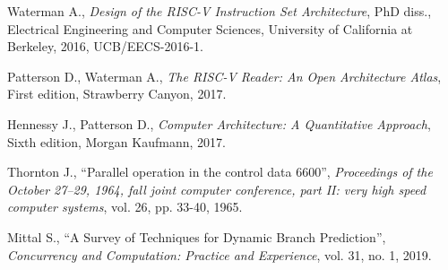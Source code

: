 \begin{thebibliography}{99}
\setlength{\parskip}{0.5\baselineskip}

    Waterman A., 
    \textit{Design of the RISC-V Instruction Set Architecture},
    PhD diss.,
    Electrical Engineering and Computer Sciences,
    University of California at Berkeley,
    2016,
    UCB/EECS-2016-1.

    Patterson D., Waterman A., 
    \textit{The RISC-V Reader: An Open Architecture Atlas},
    First edition,
    Strawberry Canyon,
    2017.

    Hennessy J., Patterson D., 
    \textit{Computer Architecture: A Quantitative Approach},
    Sixth edition,
    Morgan Kaufmann,
    2017.

    Thornton J.,
    ``Parallel operation in the control data 6600'',  
    \textit{Proceedings of the October 27–29, 1964, fall joint computer conference, part II: very high speed computer systems},
    vol. 26, pp. 33-40, 
    1965.

    Mittal S.,
    ``A Survey of Techniques for Dynamic Branch Prediction'',  
    \textit{Concurrency and Computation: Practice and Experience},
    vol. 31, no. 1, 
    2019.
    
\end{thebibliography}